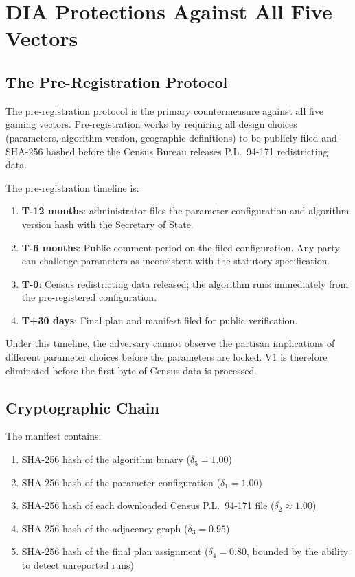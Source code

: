 \section{DIA Protections Against All Five Vectors}
\label{sec:dia}

\subsection{The Pre-Registration Protocol}

The \dia{} pre-registration protocol is the primary countermeasure against
all five gaming vectors.
Pre-registration works by requiring all design choices (parameters, algorithm
version, geographic definitions) to be publicly filed and SHA-256 hashed
before the Census Bureau releases P.L.\ 94-171 redistricting data.

The pre-registration timeline is:
\begin{enumerate}
\item \textbf{T-12 months}: \dia{} administrator files the parameter
  configuration and algorithm version hash with the Secretary of State.
\item \textbf{T-6 months}: Public comment period on the filed configuration.
  Any party can challenge parameters as inconsistent with the statutory
  specification.
\item \textbf{T-0}: Census redistricting data released; the algorithm
  runs immediately from the pre-registered configuration.
\item \textbf{T+30 days}: Final plan and manifest filed for public
  verification.
\end{enumerate}

Under this timeline, the adversary cannot observe the partisan implications
of different parameter choices before the parameters are locked.
V1 is therefore eliminated before the first byte of Census data is processed.

\subsection{Cryptographic Chain}

The \dia{} manifest contains:
\begin{enumerate}
\item SHA-256 hash of the algorithm binary ($\delta_5 = 1.00$)
\item SHA-256 hash of the parameter configuration ($\delta_1 = 1.00$)
\item SHA-256 hash of each downloaded Census P.L.\ 94-171 file ($\delta_2 \approx 1.00$)
\item SHA-256 hash of the adjacency graph ($\delta_3 = 0.95$)
\item SHA-256 hash of the final plan assignment ($\delta_4 = 0.80$, bounded
  by the ability to detect unreported runs)
\end{enumerate}

